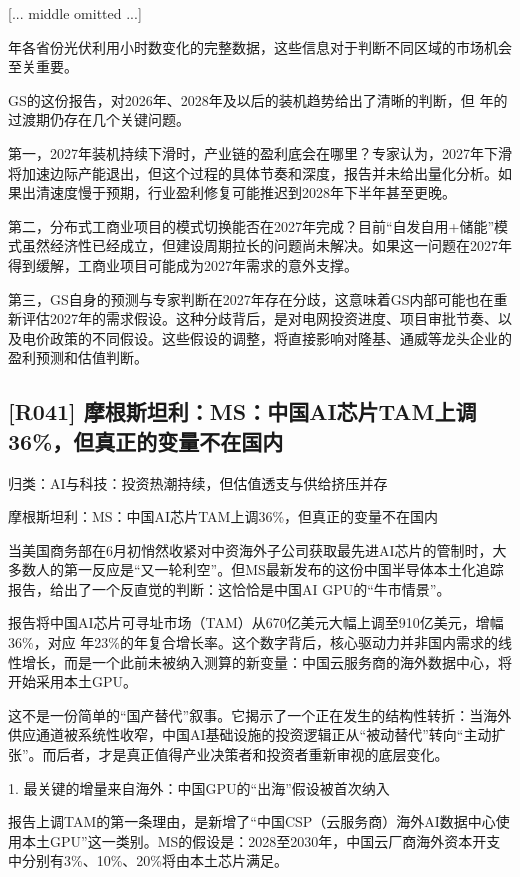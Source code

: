 \documentclass[11pt]{ctexart}
\begin{document}
[... middle omitted ...]

年各省份光伏利用小时数变化的完整数据，这些信息对于判断不同区域的市场机会至关重要。

GS的这份报告，对2026年、2028年及以后的装机趋势给出了清晰的判断，但 年的过渡期仍存在几个关键问题。

第一，2027年装机持续下滑时，产业链的盈利底会在哪里？专家认为，2027年下滑将加速边际产能退出，但这个过程的具体节奏和深度，报告并未给出量化分析。如果出清速度慢于预期，行业盈利修复可能推迟到2028年下半年甚至更晚。

第二，分布式工商业项目的模式切换能否在2027年完成？目前“自发自用+储能”模式虽然经济性已经成立，但建设周期拉长的问题尚未解决。如果这一问题在2027年得到缓解，工商业项目可能成为2027年需求的意外支撑。

第三，GS自身的预测与专家判断在2027年存在分歧，这意味着GS内部可能也在重新评估2027年的需求假设。这种分歧背后，是对电网投资进度、项目审批节奏、以及电价政策的不同假设。这些假设的调整，将直接影响对隆基、通威等龙头企业的盈利预测和估值判断。

\subsection{[R041] 摩根斯坦利：MS：中国AI芯片TAM上调36\%，但真正的变量不在国内}
{\small\color{refgray}归类：AI与科技：投资热潮持续，但估值透支与供给挤压并存}

摩根斯坦利：MS：中国AI芯片TAM上调36\%，但真正的变量不在国内

当美国商务部在6月初悄然收紧对中资海外子公司获取最先进AI芯片的管制时，大多数人的第一反应是“又一轮利空”。但MS最新发布的这份中国半导体本土化追踪报告，给出了一个反直觉的判断：这恰恰是中国AI GPU的“牛市情景”。

报告将中国AI芯片可寻址市场（TAM）从670亿美元大幅上调至910亿美元，增幅36\%，对应 年23\%的年复合增长率。这个数字背后，核心驱动力并非国内需求的线性增长，而是一个此前未被纳入测算的新变量：中国云服务商的海外数据中心，将开始采用本土GPU。

这不是一份简单的“国产替代”叙事。它揭示了一个正在发生的结构性转折：当海外供应通道被系统性收窄，中国AI基础设施的投资逻辑正从“被动替代”转向“主动扩张”。而后者，才是真正值得产业决策者和投资者重新审视的底层变化。

1. 最关键的增量来自海外：中国GPU的“出海”假设被首次纳入

报告上调TAM的第一条理由，是新增了“中国CSP（云服务商）海外AI数据中心使用本土GPU”这一类别。MS的假设是：2028至2030年，中国云厂商海外资本开支中分别有3\%、10\%、20\%将由本土芯片满足。
\end{document}
